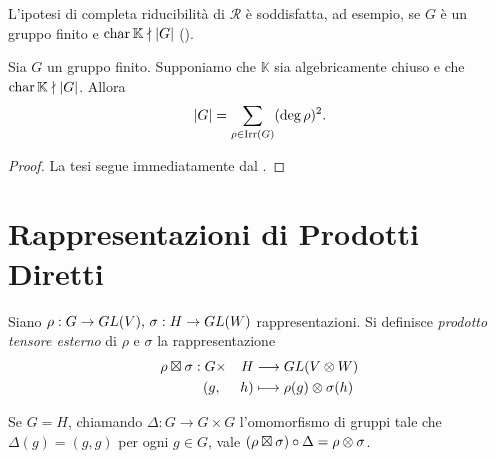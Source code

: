 \begin{remark}
L'ipotesi di completa riducibilità di $\mathcal{R}$ è soddisfatta, ad esempio, se $G$ è un gruppo finito e $\operatorname{char}\mathbb{K}\nmid|G|$ ().
\end{remark}

\begin{corollary}
Sia $G$ un gruppo finito. Supponiamo che $\mathbb{K}$ sia algebricamente chiuso e che $\operatorname{char}\mathbb{K}\nmid |G|$. Allora
$$
|G|=\sum_{\rho\in\operatorname{Irr}(G)}(\deg\rho)^2.
$$
\end{corollary}
\begin{proof}
La tesi segue immediatamente dal .
\end{proof}

\section{Rappresentazioni di Prodotti Diretti}

\begin{definition}
Siano $\rho:G\to GL(V),\,\allowbreak\sigma:H\to GL(W)$ rappresentazioni. Si definisce \emph{prodotto tensore esterno} di $\rho$ e $\sigma$ la rappresentazione
\begin{alignat*}{2}
\rho\boxtimes\sigma:G&\times &H&\longrightarrow GL(V\otimes W)\\
(g&,&h)&\longmapsto\rho(g)\otimes\sigma(h)
\end{alignat*}
\end{definition}

\begin{remark}
Se $G=H$, chiamando $\Delta:G\to G\times G$ l'omomorfismo di gruppi tale che $\Delta(g)=(g,g)$ per ogni $g\in G$, vale $(\rho\boxtimes\sigma)\circ\Delta=\rho\otimes\sigma$.
\end{remark}


